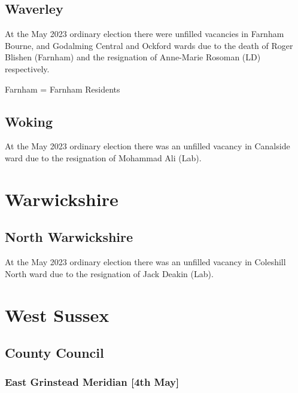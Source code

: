\documentclass[a4paper,openany]{book}
\begin{document}
\begin{resultsiii}
\subsection*{Waverley}

At the May 2023 ordinary election there were unfilled vacancies in Farnham Bourne, and Godalming Central and Ockford wards due to the death of Roger Blishen (Farnham) and the resignation of Anne-Marie Rosoman (LD) respectively.%
%

Farnham = Farnham Residents

\subsection*{Woking}

At the May 2023 ordinary election there was an unfilled vacancy in Canalside ward due to the resignation of Mohammad Ali (Lab).%

\section{Warwickshire}

\subsection*{North Warwickshire}

At the May 2023 ordinary election there was an unfilled vacancy in Coleshill North ward due to the resignation of Jack Deakin (Lab).%

\section{West Sussex}

\subsection*{County Council}

\subsubsection*{East Grinstead Meridian \hspace*{\fill}\nolinebreak[1]%
	\enspace\hspace*{\fill}
	[4th May]}


\end{resultsiii}
\end{document}
